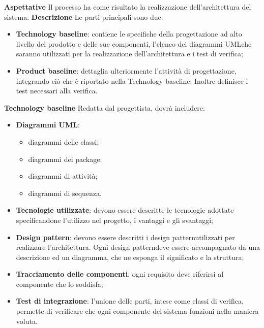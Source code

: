 \textbf{Aspettative} \newline \newline
Il processo ha come risultato la realizzazione dell'architettura del sistema. 
\newline \newline
\textbf{Descrizione} \newline \newline
Le parti principali sono due:
	\begin{itemize}
		\item \textbf{Technology baseline}: contiene le specifiche della 
			progettazione ad alto livello del prodotto e delle sue componenti, l'elenco dei 
			diagrammi UML\glosp che saranno utilizzati per la realizzazione 
			dell'architettura e i test di verifica;
		\item \textbf{Product baseline}: dettaglia ulteriormente l'attività di 
			progettazione, integrando ciò che è riportato nella Technology baseline. Inoltre 
			definisce i test necessari alla verifica.
	\end{itemize}

\textbf{Technology baseline} \newline \newline
Redatta dal progettista, dovrà includere:
	\begin{itemize}
		\item \textbf{Diagrammi UML\glo}:
		\begin{itemize}
			\item diagrammi delle classi;
			\item diagrammi dei package;
			\item diagrammi di attività;
			\item diagrammi di sequenza.
		\end{itemize}
		\item \textbf{Tecnologie utilizzate}: devono essere descritte le tecnologie 
			adottate specificandone l'utilizzo nel progetto, i vantaggi e gli svantaggi;
		\item \textbf{Design pattern\glo}: devono essere descritti i design 
			pattern\glosp utilizzati per realizzare l'architettura. Ogni design 
			pattern\glosp deve essere accompagnato da una descrizione ed un diagramma, che 
			ne esponga il significato e la struttura;
		\item \textbf{Tracciamento delle componenti}: ogni requisito deve riferirsi 
			al componente che lo soddisfa;
		\item \textbf{Test di integrazione}: l'unione delle parti, intese come 
			classi di verifica, permette di verificare che ogni componente del sistema 
			funzioni nella maniera voluta.
	\end{itemize}
			
